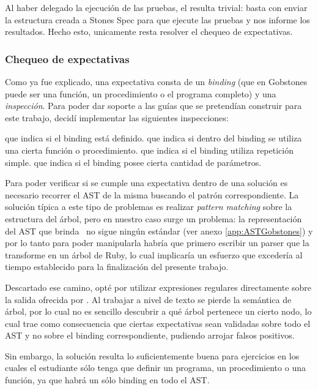 Al haber delegado la ejecución de las pruebas, el  resulta trivial: basta con enviar la estructura creada a Stones Spec para que ejecute las pruebas y nos informe los resultados. Hecho esto, unicamente resta resolver el chequeo de expectativas.

\subsubsection{Chequeo de expectativas}
Como ya fue explicado, una expectativa consta de un \emph{binding} (que en Gobstones puede ser una función, un procedimiento o el programa completo) y una \emph{inspección}. Para poder dar soporte a las guías que se pretendían construir para este trabajo, decidí implementar las siguientes inspecciones:

\begin{itemize}
   que indica si el binding está definido.
   que indica si dentro del binding se utiliza una cierta función o procedimiento.
   que indica si el binding utiliza repetición simple.
   que indica si el binding posee cierta cantidad de parámetros.
\end{itemize}

Para poder verificar si se cumple una expectativa dentro de una solución es necesario recorrer el AST de la misma buscando el patrón correspondiente. La solución típica a este tipo de problemas es realizar \emph{pattern matching} sobre la estructura del árbol, pero en nuestro caso surge un problema: la representación del AST que brinda \pyGob\ no sigue ningún estándar (ver anexo \ref{app:ASTGobstones}) y por lo tanto para poder manipularla habría que primero escribir un parser que la transforme en un árbol de Ruby, lo cual implicaría un esfuerzo que excedería al tiempo establecido para la finalización del presente trabajo.

Descartado ese camino, opté por utilizar expresiones regulares directamente sobre la salida ofrecida por \pyGob. Al trabajar a nivel de texto se pierde la semántica de árbol, por lo cual no es sencillo descubrir a qué árbol pertenece un cierto nodo, lo cual trae como consecuencia que ciertas expectativas sean validadas sobre todo el AST y no sobre el binding correspondiente, pudiendo arrojar falsos positivos.

Sin embargo, la solución resulta lo suficientemente buena para ejercicios en los cuales el estudiante sólo tenga que definir un programa, un procedimiento o una función, ya que habrá un sólo binding en todo el AST.
